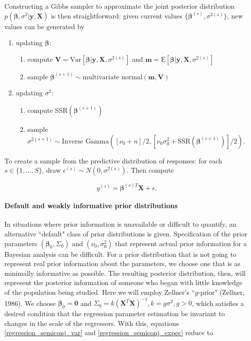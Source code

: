 \documentclass[12pt, a4paper]{article}
\begin{document}
\noindent Constructing a Gibbs sampler to approximate the joint posterior distribution $p(\boldsymbol\beta,\sigma^2|\mathbf{y,X})$ is then straightforward:  given current values $\{\boldsymbol\beta^{(s)},\sigma^{2(s)}\}$, new values can be generated by

\begin{enumerate}
    \item updating $\boldsymbol\beta$:
    \begin{enumerate}
        \item compute $\mathbf{V} = \text{Var}[\boldsymbol\beta|\mathbf{y,X},\sigma^{2(s)}]$ and $\mathbf{m} = \text{E}[\boldsymbol\beta|\mathbf{y,X},\sigma^{2(s)}]$
        \item sample $\boldsymbol\beta^{(s+1)} \sim \text{multivariate normal}(\mathbf{m,V})$
    \end{enumerate}
    \item updating $\sigma^2$:
    \begin{enumerate}
        \item compute SSR$(\boldsymbol\beta^{(s+1)})$
        \item sample $\sigma^{2(s+1)} \sim \text{Inverse Gamma}([\nu_0 + n]/2,[\nu_0\sigma_0^2 + \text{SSR}(\boldsymbol\beta^{(s+1)})]/2)$.
    \end{enumerate}
\end{enumerate}

To create a sample from the predictive distribution of responses:  for each $s\in\{1,...,S\}$, draw $\epsilon^{(s)} \sim N(0,\sigma^{2(s)})$.  Then compute

$$y^{(s)} = \boldsymbol\beta^{(s)T}\mathbf{X} + \epsilon.$$

    \paragraph{Default and weakly informative prior distributions}
    In situations where prior information is unavailable or difficult to quantify, an alternative ``default" class of prior distributions is given. Specification of the prior parameters $(\boldsymbol\beta_0, \Sigma_0)$ and $(\nu_0,\sigma^2_0)$ that represent actual prior information for a Bayesian analysis can be difficult.  For a prior distribution that is not going to represent real prior information about the parameters, we choose one that is as minimally informative as possible.  The resulting posterior distribution, then, will represent the posterior information of someone who began with little knowledge of the population being studied.  Here we will employ Zellner's ``$g$-prior" (Zellner, 1986).  We choose $\boldsymbol\beta_0 = \mathbf{0}$ and $\Sigma_0 = k(\mathbf{X}^T\mathbf{X})^{-1}, k = g\sigma^2, g > 0$, which satisfies a desired condition that the regression parameter estimation be invariant to changes in the scale of the regressors.  With this, equations \ref{regression_semiconj_var} and \ref{regression_semiconj_expec} reduce to
\end{document}
